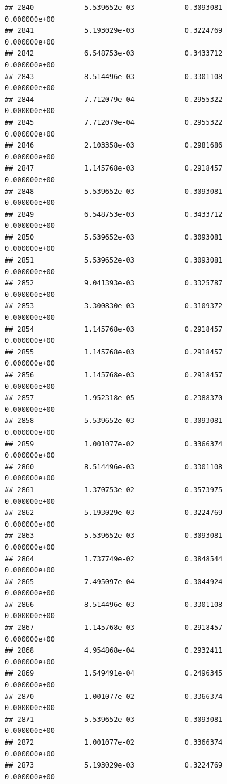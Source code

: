 \documentclass[
]{article}
\begin{document}
\begin{verbatim}
## 2840            5.539652e-03            0.3093081            0.000000e+00
## 2841            5.193029e-03            0.3224769            0.000000e+00
## 2842            6.548753e-03            0.3433712            0.000000e+00
## 2843            8.514496e-03            0.3301108            0.000000e+00
## 2844            7.712079e-04            0.2955322            0.000000e+00
## 2845            7.712079e-04            0.2955322            0.000000e+00
## 2846            2.103358e-03            0.2981686            0.000000e+00
## 2847            1.145768e-03            0.2918457            0.000000e+00
## 2848            5.539652e-03            0.3093081            0.000000e+00
## 2849            6.548753e-03            0.3433712            0.000000e+00
## 2850            5.539652e-03            0.3093081            0.000000e+00
## 2851            5.539652e-03            0.3093081            0.000000e+00
## 2852            9.041393e-03            0.3325787            0.000000e+00
## 2853            3.300830e-03            0.3109372            0.000000e+00
## 2854            1.145768e-03            0.2918457            0.000000e+00
## 2855            1.145768e-03            0.2918457            0.000000e+00
## 2856            1.145768e-03            0.2918457            0.000000e+00
## 2857            1.952318e-05            0.2388370            0.000000e+00
## 2858            5.539652e-03            0.3093081            0.000000e+00
## 2859            1.001077e-02            0.3366374            0.000000e+00
## 2860            8.514496e-03            0.3301108            0.000000e+00
## 2861            1.370753e-02            0.3573975            0.000000e+00
## 2862            5.193029e-03            0.3224769            0.000000e+00
## 2863            5.539652e-03            0.3093081            0.000000e+00
## 2864            1.737749e-02            0.3848544            0.000000e+00
## 2865            7.495097e-04            0.3044924            0.000000e+00
## 2866            8.514496e-03            0.3301108            0.000000e+00
## 2867            1.145768e-03            0.2918457            0.000000e+00
## 2868            4.954868e-04            0.2932411            0.000000e+00
## 2869            1.549491e-04            0.2496345            0.000000e+00
## 2870            1.001077e-02            0.3366374            0.000000e+00
## 2871            5.539652e-03            0.3093081            0.000000e+00
## 2872            1.001077e-02            0.3366374            0.000000e+00
## 2873            5.193029e-03            0.3224769            0.000000e+00

\end{verbatim}
\end{document}
